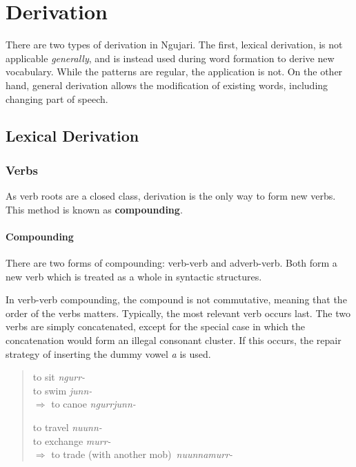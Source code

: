 \chapter{Derivation}

There are two types of derivation in Ngujari. The first, lexical derivation, is
not applicable \textit{generally}, and is instead used during word formation to
derive new vocabulary. While the patterns are regular, the application is not.
On the other hand, general derivation allows the modification of existing words,
including changing part of speech.

\section{Lexical Derivation}

\subsection{Verbs}

As verb roots are a closed class, derivation is the only way to form new verbs.
This method is known as \textbf{compounding}.

\subsubsection{Compounding}

There are two forms of compounding: verb-verb and adverb-verb. Both form a new
verb which is treated as a whole in syntactic structures.

In verb-verb compounding, the compound is not commutative, meaning that the
order of the verbs matters. Typically, the most relevant verb occurs last. The
two verbs are simply concatenated, except for the special case in which the
concatenation would form an illegal consonant cluster. If this occurs, the
repair strategy of inserting the dummy vowel \textit{a} is used.

\begin{quote}
\begin{multicols}{2}
to sit \textit{ngurr-}\\
to swim \textit{junn-}\\
$\Rightarrow$ to canoe \textit{ngurrjunn-}

to travel \textit{nuunn-}\\
to exchange \textit{murr-}\\
$\Rightarrow$ to trade (with another mob)~\textit{nuunnamurr-}
\end{multicols}
\end{quote}

